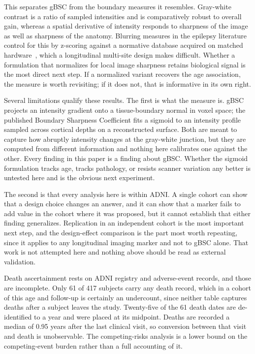 \documentclass[blue]{ludusofficial}  %
\begin{document}
This separates gBSC from the boundary measures it resembles. Gray-white contrast is a ratio of sampled intensities and is comparatively robust to overall gain, whereas a spatial derivative of intensity responds to sharpness of the image as well as sharpness of the anatomy. Blurring measures in the epilepsy literature control for this by z-scoring against a normative database acquired on matched hardware~\cite{huppertz2005enhanced,blackmon2015cortical}, which a longitudinal multi-site design makes difficult. Whether a formulation that normalizes for local image sharpness retains biological signal is the most direct next step. If a normalized variant recovers the age association, the measure is worth revisiting; if it does not, that is informative in its own right.

Several limitations qualify these results. The first is what the measure is. gBSC projects an intensity gradient onto a tissue-boundary normal in voxel space; the published Boundary Sharpness Coefficient fits a sigmoid to an intensity profile sampled across cortical depths on a reconstructed surface. Both are meant to capture how abruptly intensity changes at the gray-white junction, but they are computed from different information and nothing here calibrates one against the other. Every finding in this paper is a finding about gBSC. Whether the sigmoid formulation tracks age, tracks pathology, or resists scanner variation any better is untested here and is the obvious next experiment.

The second is that every analysis here is within ADNI. A single cohort can show that a design choice changes an answer, and it can show that a marker fails to add value in the cohort where it was proposed, but it cannot establish that either finding generalizes. Replication in an independent cohort is the most important next step, and the design-effect comparison is the part most worth repeating, since it applies to any longitudinal imaging marker and not to gBSC alone. That work is not attempted here and nothing above should be read as external validation.

Death ascertainment rests on ADNI registry and adverse-event records, and those are incomplete. Only 61 of 417 subjects carry any death record, which in a cohort of this age and follow-up is certainly an undercount, since neither table captures deaths after a subject leaves the study. Twenty-five of the 61 death dates are de-identified to a year and were placed at its midpoint. Deaths are recorded a median of 0.95 years after the last clinical visit, so conversion between that visit and death is unobservable. The competing-risks analysis is a lower bound on the competing-event burden rather than a full accounting of it.
\end{document}
